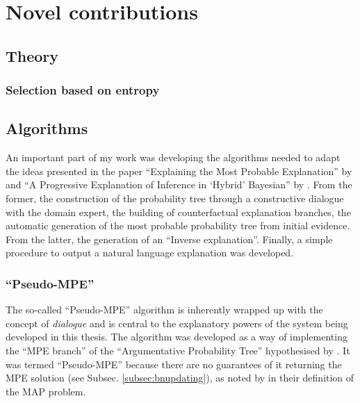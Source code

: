 \section{Novel contributions}\label{sec:novel-contributions}

\subsection{Theory} \label{subsec:theory}

\subsubsection{Selection based on entropy}

\subsection{Algorithms} \label{subsec:algorithms}
An important part of my work was developing the algorithms needed to adapt the ideas presented in the paper \enquote{Explaining the Most Probable Explanation} by \cite{Butz2018} and \enquote{A Progressive Explanation of Inference in \enquote{Hybrid} Bayesian} by \cite{Kyrimi2016}.
From the former, the construction of the probability tree through a constructive dialogue with the domain expert, the building of counterfactual explanation branches, the automatic generation of the most probable probability tree from initial evidence.
From the latter, the generation of an \enquote{Inverse explanation}.
Finally, a simple procedure to output a natural language explanation was developed.

\subsubsection{\enquote{Pseudo-MPE}} \label{subsubsec:pseudo-mpe}
The so-called \enquote{Pseudo-MPE} algorithm is inherently wrapped up with the concept of \textit{dialogue} and is central to the explanatory powers of the system being developed in this thesis.
The algorithm was developed as a way of implementing the \enquote{MPE branch} of the \enquote{Argumentative Probability Tree} hypothesised by \cite{Butz2018}.
It was termed \enquote{Pseudo-MPE} because there are no guarantees of it returning the MPE solution (see Subsec. \ref{subsec:bnupdating}), as noted by \cite{koller2007introduction} in their definition of the MAP problem.

